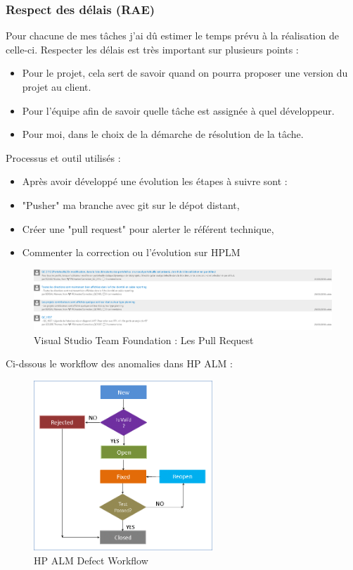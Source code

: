 \subsubsection{Respect des délais (RAE)}
Pour chacune de mes tâches j'ai dû estimer le temps prévu à la réalisation de celle-ci. Respecter les délais est très important sur plusieurs points :
\begin{itemize}
    \item Pour le projet, cela sert de savoir quand on pourra proposer une version du projet au client.
    \item Pour l'équipe afin de savoir quelle tâche est assignée à quel développeur. 
    \item Pour moi, dans le choix de la démarche de résolution de la tâche.
\end{itemize}

Processus et outil utilisés :
\begin{itemize}
    \item Après avoir développé une évolution les étapes à suivre sont :
    \item "Pusher" ma branche avec git sur le dépot distant,
    \item Créer une "pull request" pour alerter le référent technique,
    \item Commenter la correction ou l'évolution sur HPLM
\end{itemize}

\begin{figure}[!h]
\centering
\includegraphics[width=1\textwidth]{images/PullRequest.png}
\caption{Visual Studio Team Foundation : Les Pull Request}
\end{figure}

Ci-dssous le workflow des anomalies dans HP ALM :
\begin{figure}[!h]
\centering
\includegraphics[width=0.6\textwidth]{images/DefectHPALM.png}
\caption{HP ALM Defect Workflow}
\end{figure}

